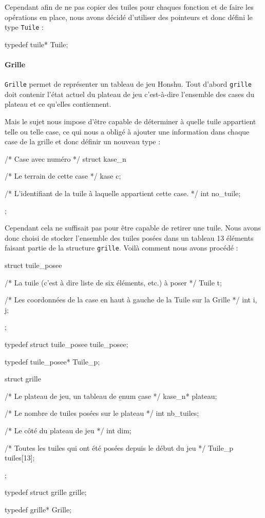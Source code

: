 \documentclass[12pt,a4paper]{article}
\begin{document}
Cependant afin de ne pas copier des tuiles pour chaques fonction et de faire les opérations en place, nous avons décidé d'utiliser des pointeurs et donc défini le type \texttt{Tuile} :

\begin{verbatimtab}[4]
typedef tuile* Tuile;
\end{verbatimtab}

\paragraph{Grille\\}

\texttt{Grille} permet de représenter un tableau de jeu Honshu.
Tout d'abord \texttt{grille} doit contenir l'état actuel du plateau de jeu c'est-à-dire l'ensemble des cases du plateau et ce qu'elles contiennent.

Mais le sujet nous impose d'être capable de déterminer à quelle tuile appartient telle ou telle case, ce qui nous a obligé à ajouter une information dans chaque case de la grille et donc définir un nouveau type :

\begin{verbatimtab}[4]
/* Case avec numéro */
struct kase_n{
	/* Le terrain de cette case */
	kase c; 
    
    /* L'identifiant de la tuile à laquelle appartient cette case. */
	int no_tuile;
};
\end{verbatimtab}

Cependant cela ne suffisait pas pour être capable de retirer une tuile. Nous avons donc choisi de stocker l'ensemble des tuiles posées dans un tableau 13 éléments faisant partie de la structure \texttt{grille}. Voilà comment nous avons procédé :

\begin{verbatimtab}[4]
struct tuile_posee{
	/* La tuile (c'est à dire liste de six éléments, etc.) à poser */
	Tuile t; 
    
    /* Les coordonnées de la case en haut à gauche de la Tuile sur la Grille */
	int i, j; 
};

typedef struct tuile_posee tuile_posee;

typedef tuile_posee* Tuile_p;

struct grille {
	/* Le plateau de jeu, un tableau de \b enum \b case */
	kase_n* plateau;
    
    /* Le nombre de tuiles posées sur le plateau */
	int nb_tuiles; 
    
    /* Le côté du plateau de jeu */
	int dim; 
    
    /* Toutes les tuiles qui ont été posées depuis le début du jeu */
	Tuile_p tuiles[13]; 
};

typedef struct grille grille;

typedef grille* Grille;

\end{verbatimtab}
\end{document}
